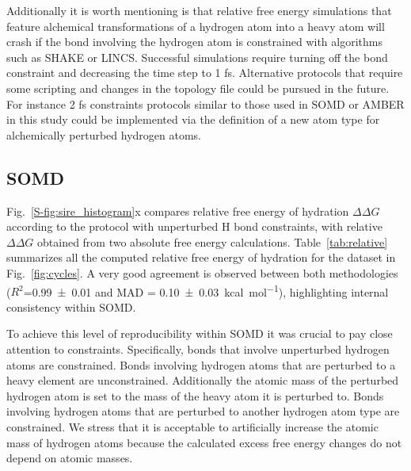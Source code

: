 \documentclass[journal=jctcce,manuscript=article]{achemso}
\newcommand{\inpopt}[1]{\texttt{#1}}
\begin{document}
Additionally it is worth mentioning is that relative free energy
simulations that feature alchemical transformations of a hydrogen atom into a heavy atom will crash if the bond involving the hydrogen atom is constrained with algorithms such as SHAKE or LINCS.
Successful simulations require turning off the bond constraint and decreasing the time step to 1 fs. Alternative protocols that require some scripting and changes in the topology file could be pursued in the future. For instance 2 fs constraints protocols similar to those used in SOMD or AMBER in this study could be implemented via the definition of a new atom type for alchemically perturbed hydrogen atoms.

\subsection{SOMD}
\label{sec:somd-results}

Fig.~\ref{S-fig:sire_histogram}x compares relative free energy of hydration
$\Delta\Delta G$ according to the protocol with unperturbed H bond constraints, with relative
$\Delta \Delta G$ obtained from two absolute free energy calculations.
Table~\ref{tab:relative} summarizes all the computed relative free energy of
hydration for the dataset in Fig.~\ref{fig:cycles}.
A very good agreement is observed between both methodologies
($R^2$=\SI{0.99+-0.01}{} and MAD = \SI{0.10+-0.03}{kcal.mol^{-1}}),
highlighting internal consistency within SOMD.

To achieve this level of reproducibility within SOMD it was crucial to pay close attention to constraints. Specifically, bonds that involve unperturbed hydrogen atoms are constrained. Bonds involving hydrogen atoms that are perturbed to a heavy element are unconstrained.  Additionally the atomic mass of the perturbed hydrogen atom is set to the mass of the heavy atom it is
perturbed to.  Bonds involving hydrogen atoms that are perturbed to another hydrogen atom type are constrained. We stress that it is acceptable to artificially increase the atomic mass of hydrogen atoms because the calculated excess free energy changes do not depend on atomic masses.
\end{document}
